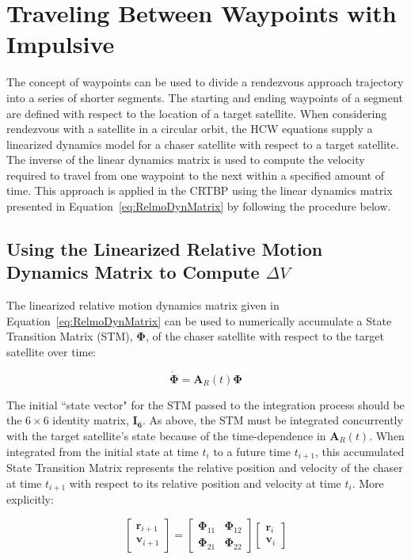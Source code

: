\documentclass[letterpaper, preprint, paper,11pt]{AAS}	%
\begin{document}
\section{Traveling Between Waypoints with Impulsive} %
The concept of waypoints can be used to divide a rendezvous approach trajectory into a series of shorter segments.  The starting and ending waypoints of a segment are defined with respect to the location of a target satellite.  When considering rendezvous with a satellite in a circular orbit, the HCW equations supply a linearized dynamics model for a chaser satellite with respect to a target satellite.  The inverse of the linear dynamics matrix is used to compute the velocity required to travel from one waypoint to the next within a specified amount of time.  This approach is applied in the CRTBP using the linear dynamics matrix presented in Equation~\eqref{eq:RelmoDynMatrix} by following the procedure below. 

\subsection{Using the Linearized Relative Motion Dynamics Matrix to Compute \(\Delta V\)}

The linearized relative motion dynamics matrix given in Equation~\eqref{eq:RelmoDynMatrix} can be used to numerically accumulate a State Transition Matrix (STM), \(\boldsymbol{\Phi}\), of the chaser satellite with respect to the target satellite over time:

\begin{equation} \label{eq:STM}
	\dot{\boldsymbol{\Phi}} = \mathbf{A}_R(t)\boldsymbol{\Phi}
\end{equation}

The initial ``state vector" for the STM passed to the integration process should be the \(6\times6\) identity matrix, \(\mathbf{I_6}\).  As above, the STM must be integrated concurrently with the target satellite's state because of the time-dependence in \(\mathbf{A}_R(t)\).  When integrated from the initial state at time \(t_i\) to a future time \(t_{i+1}\), this accumulated State Transition Matrix represents the relative position and velocity of the chaser at time \(t_{i+1}\) with respect to its relative position and velocity at time \(t_i\).  More explicitly:


\begin{equation}
	\begin{bmatrix}
		\mathbf{r}_{i+1} \\
		\mathbf{v}_{i+1}
	\end{bmatrix}
	= 
	\begin{bmatrix}
		\boldsymbol{\Phi}_{11} & \boldsymbol{\Phi}_{12} \\
		\boldsymbol{\Phi}_{21} & \boldsymbol{\Phi}_{22}
	\end{bmatrix}
	\begin{bmatrix}
		\mathbf{r}_i \\
		\mathbf{v}_i
	\end{bmatrix}
\end{equation}
\end{document}
